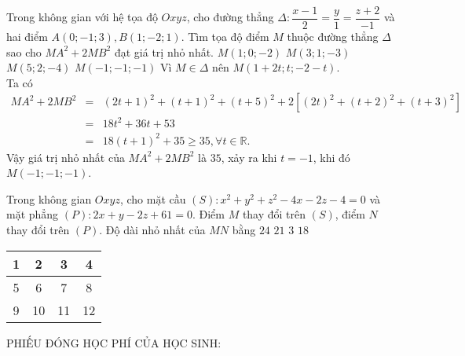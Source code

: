 	\begin{ex}%
	Trong không gian với hệ tọa độ $Oxyz$, cho đường thẳng $\Delta \colon \dfrac{x-1}{2}=\dfrac{y}{1}=\dfrac{z+2}{-1}$ và hai điểm $A(0;-1;3), B(1;-2;1)$. Tìm tọa độ điểm $M$ thuộc đường thẳng $\Delta$ sao cho $MA^2+2MB^2$ đạt giá trị nhỏ nhất.
	\choice
	{$M(1;0;-2)$}
	{$M(3;1;-3)$}
	{$M(5;2;-4)$}
	{\True $M(-1;-1;-1)$}
	\loigiai
	{ Vì $M \in \Delta$ nên $M\left( 1+2t;t;-2-t\right)$.\\
	Ta có 
	\begin{eqnarray*}
	MA^2+2MB^2&=&(2t+1)^2+(t+1)^2+(t+5)^2 +2 \left[ (2t)^2+ (t+2)^2 +(t+3)^2\right]\\
	&= & 18t^2 +36t +53\\
	&= & 18(t+1)^2+35 \geq 35, \forall t \in \mathbb{R}.
	\end{eqnarray*}
	Vậy giá trị nhỏ nhất của $MA^2+2MB^2$ là $35$, xảy ra khi $t=-1$, khi đó $M(-1;-1;-1)$.
	}
	\end{ex}
	\begin{ex}%
	Trong không gian $Oxyz$, cho mặt cầu $(S)\colon x^2+y^2+z^2-4x-2z-4=0$ và mặt phẳng $(P)\colon 2x+y-2z+61=0$. Điểm $M$ thay đổi trên $(S)$, điểm $N$ thay đổi trên $(P)$. Độ dài nhỏ nhất của $MN$ bằng
	\choice
	{$24$}
	{$21$}
	{$3$}
	{\True $18$}
	\end{ex}

\begin{center}
	\begin{tabular}{|c|c|c|c|}
		\hline 
		1 & 2 & 3&4 \\ \hline
		5 & 6 & 7&8 \\ \hline
		9 & 10 & 11&12 \\ \hline
	\end{tabular}
	\begin{center}
		PHIẾU ĐÓNG HỌC PHÍ CỦA HỌC SINH: 
	\end{center}
\end{center}